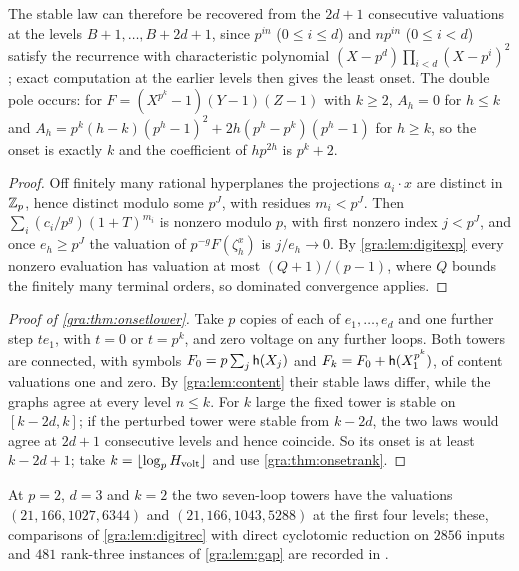 The stable law can therefore be recovered from the $2d+1$ consecutive
valuations at the levels $B+1,\dots,B+2d+1$, since $p^{in}$ ($0\le i\le d$)
and $np^{in}$ ($0\le i<d$) satisfy the recurrence with characteristic
polynomial $(X-p^d)\prod_{i<d}(X-p^i)^2$; exact computation at the earlier
levels then gives the least onset. The double pole occurs: for
$F=(X^{p^k}-1)(Y-1)(Z-1)$ with $k\ge2$, $A_h=0$ for $h\le k$ and
$A_h=p^k(h-k)(p^h-1)^2+2h(p^h-p^k)(p^h-1)$ for $h\ge k$, so the onset is
exactly $k$ and the coefficient of $hp^{2h}$ is $p^k+2$.


\begin{proof}
Off finitely many rational hyperplanes the projections $a_i\cdot x$ are
distinct in $\mathbb{Z}_p$, hence distinct modulo some $p^J$, with residues
$m_i<p^J$. Then $\sum_i(c_i/p^g)(1+T)^{m_i}$ is nonzero modulo $p$, with first
nonzero index $j<p^J$, and once $e_h\ge p^J$ the valuation of
$p^{-g}F(\zeta_h^x)$ is $j/e_h\to0$. By \cref{gra:lem:digitexp} every nonzero
evaluation has valuation at most $(Q+1)/(p-1)$, where $Q$ bounds the finitely
many terminal orders, so dominated convergence applies.
\end{proof}

\begin{proof}[Proof of \cref{gra:thm:onsetlower}]
Take $p$ copies of each of $e_1,\dots,e_d$ and one further step $te_1$, with
$t=0$ or $t=p^k$, and zero voltage on any further loops. Both towers are
connected, with symbols $F_0=p\sum_j\mathsf{h}(X_j)$ and
$F_k=F_0+\mathsf{h}(X_1^{p^k})$, of content valuations one and zero. By
\cref{gra:lem:content} their stable laws differ, while the graphs agree at
every level $n\le k$. For $k$ large the fixed tower is stable on
$[k-2d,k]$; if the perturbed tower were stable from $k-2d$, the two laws
would agree at $2d+1$ consecutive levels and hence coincide. So its onset
is at least $k-2d+1$; take $k=\lfloor\log_pH_{\mathrm{volt}}\rfloor$ and use
\cref{gra:thm:onsetrank}.
\end{proof}

At $p=2$, $d=3$ and $k=2$ the two seven-loop towers have the valuations
$(21,166,1027,6344)$ and $(21,166,1043,5288)$ at the first four levels;
these, comparisons of \cref{gra:lem:digitrec} with direct cyclotomic
reduction on $2856$ inputs and $481$ rank-three instances of
\cref{gra:lem:gap} are recorded in
.

